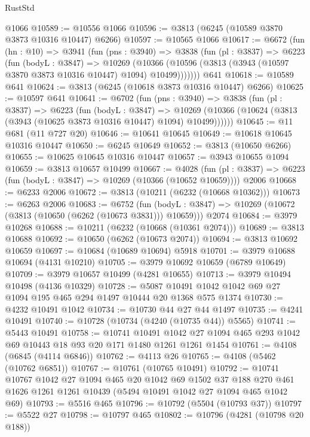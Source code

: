 \begin{lexlean}{RustStd}
\begin{coremodule}
    @1066
@10589 := @10556 @1066
@10596 := @3813 (@6245 (@10589 @3870 @3873 @10316 @10447) @6266)
@10597 := @10565 @1066
@10617 := @6672
    (fun (hn : @10) =>
    @3941
      (fun (pns : @3940) =>
      @3838
        (fun (pl : @3837) =>
        @6223
          (fun (bodyL : @3847) =>
          @10269
            (@10366 (@10596 (@3813 (@3943 (@10597 @3870 @3873 @10316 @10447) @1094) @10499)))))))
    @641
@10618 := @10589 @641
@10624 := @3813 (@6245 (@10618 @3873 @10316 @10447) @6266)
@10625 := @10597 @641
@10641 := @6702
    (fun (pns : @3940) =>
    @3838
      (fun (pl : @3837) =>
      @6223
        (fun (bodyL : @3847) =>
        @10269 (@10366 (@10624 (@3813 (@3943 (@10625 @3873 @10316 @10447) @1094) @10499))))))
@10645 := @11 @681 (@11 @727 @20)
@10646 := @10641 @10645
@10649 := @10618 @10645 @10316 @10447
@10650 := @6245 @10649
@10652 := @3813 (@10650 @6266)
@10655 := @10625 @10645 @10316 @10447
@10657 := @3943 @10655 @1094
@10659 := @3813 @10657 @10499
@10667 := @4028
    (fun (pl : @3837) => @6223 (fun (bodyL : @3847) => @10269 (@10366 (@10652 @10659))))
    @2006
@10668 := @6233 @2006
@10672 := @3813 (@10211 (@6232 (@10668 @10362)))
@10673 := @6263 @2006
@10683 := @6752
    (fun (bodyL : @3847) => @10269 (@10672 (@3813 (@10650 (@6262 (@10673 @3831))) @10659)))
    @2074
@10684 := @3979 @10268
@10688 := @10211 (@6232 (@10668 (@10361 @2074)))
@10689 := @3813 @10688
@10692 := @10650 (@6262 (@10673 @2074))
@10694 := @3813 @10692 @10659
@10697 := @10684 (@10689 @10694) @5918
@10701 := @3979 @10688 @10694 (@4131 @10210)
@10705 := @3979 @10692 @10659 (@6789 @10649)
@10709 := @3979 @10657 @10499 (@4281 @10655)
@10713 := @3979 @10494 @10498 (@4136 @10329)
@10728 := @5087 @10491 @1042 @1042 @69 @27 @1094 @195 @465 @294 @1497 @10444 @20 @1368 @575 @1374
@10730 := @4232 @10491 @1042
@10734 := @10730 @44 @27 @44 @1497
@10735 := @4241 @10491
@10740 := @10728 (@10734 (@4240 (@10735 @44)) @5565)
@10741 := @5443 @10491
@10758 := @10741
    @10491
    @1042
    @27
    @1094
    @465
    @293
    @1042
    @69
    @10443
    @18
    @93
    @20
    @171
    @1480
    @1261
    @1261
    @1454
@10761 := @4108 (@6845 (@4114 @6846))
@10762 := @4113 @26
@10765 := @4108 (@5462 (@10762 @6851))
@10767 := @10761 (@10765 @10491)
@10792 := @10741
    @10767
    @1042
    @27
    @1094
    @465
    @20
    @1042
    @69
    @1502
    @37
    @188
    @270
    @461
    @1626
    @1261
    @1261
    @10439
    (@5494 @10491 @1042 @27 @1094 @465 @1042 @69)
@10793 := @5516 @465
@10796 := @10792 (@5504 (@10793 @37))
@10797 := @5522 @27
@10798 := @10797 @465
@10802 := @10796 (@4281 (@10798 @20 @188))

\end{coremodule}
\end{lexlean}
